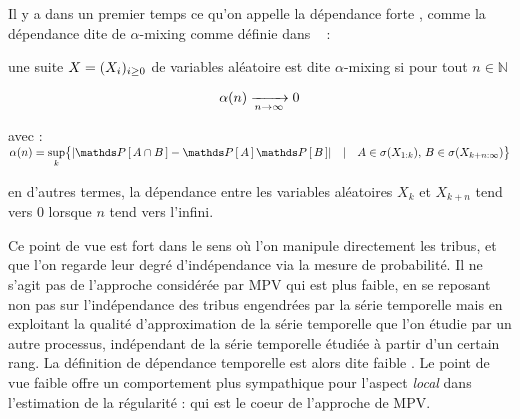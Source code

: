 
Il y a dans un premier temps ce qu'on appelle la dépendance \og forte \fg, comme la dépendance dite de \og $\alpha$-mixing \fg comme définie dans ~\cite{estimation-dependent-strong-mixing} :


\begin{definition*}

    une suite $X = ( {X}_{i})_{i \geq 0}$ de variables aléatoire est dite $\alpha$-mixing si pour tout $n \in \mathds N$


    $$
        \alpha(n) \xrightarrow[ n \rightarrow \infty ]{} 0
    $$

    avec : $\alpha(n) = \sup\limits_k \bigl\{ \lvert \proba{A \cap B} - \proba{A}\proba{B} \rvert \quad | \quad A \in \sigma( X_{1:k} ), \, B \in \sigma(X_{k+n : \infty}) \bigr\}$

    en d'autres termes, la \og dépendance \fg {} entre les variables aléatoires $X_k$ et $X_{k+n}$ tend vers 0 lorsque $n$ tend vers l'infini.
\end{definition*}

Ce point de vue est \og fort \fg dans le sens où l'on manipule directement les tribus, et que l'on regarde leur degré d'indépendance via la mesure de probabilité. Il ne s'agit pas de l'approche considérée par MPV qui est plus faible, en se reposant non pas sur l'indépendance des tribus engendrées par la série temporelle mais en exploitant la qualité d'approximation de la série temporelle que l'on étudie par un autre processus, indépendant de la série temporelle étudiée à partir d'un certain rang. La définition de dépendance temporelle est alors dite \og faible \fg. Le point de vue faible offre un comportement plus sympathique pour l'aspect \emph{local} dans l'estimation de la régularité : qui est le coeur de l'approche de MPV.
